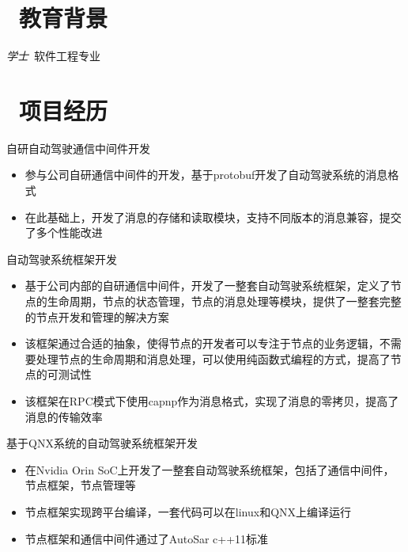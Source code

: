 \documentclass{resume}
\begin{document}


 
\section{\faGraduationCap\  教育背景}
\textit{学士}\ 软件工程专业


\section{\faUsers\ 项目经历}
\role{实习} {}
自研自动驾驶通信中间件开发
\begin{itemize}
  \item 参与公司自研通信中间件的开发，基于protobuf开发了自动驾驶系统的消息格式
  \item 在此基础上，开发了消息的存储和读取模块，支持不同版本的消息兼容，提交了多个性能改进
\end{itemize}
\role{}{}
自动驾驶系统框架开发
\begin{itemize}
  \item 基于公司内部的自研通信中间件，开发了一整套自动驾驶系统框架，定义了节点的生命周期，节点的状态管理，节点的消息处理等模块，提供了一整套完整的节点开发和管理的解决方案
  \item 该框架通过合适的抽象，使得节点的开发者可以专注于节点的业务逻辑，不需要处理节点的生命周期和消息处理，可以使用纯函数式编程的方式，提高了节点的可测试性
  \item 该框架在RPC模式下使用capnp作为消息格式，实现了消息的零拷贝，提高了消息的传输效率

\end{itemize}

基于QNX系统的自动驾驶系统框架开发
\begin{itemize}
  \item 在Nvidia Orin SoC上开发了一整套自动驾驶系统框架，包括了通信中间件，节点框架，节点管理等
  \item 节点框架实现跨平台编译，一套代码可以在linux和QNX上编译运行
  \item 节点框架和通信中间件通过了AutoSar c++11标准
\end{itemize}
\end{document}
